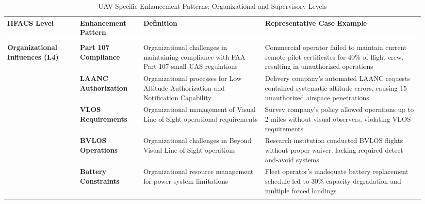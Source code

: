 \begin{table*}[!htbp]
\centering
\caption{UAV-Specific Enhancement Patterns: Organizational and Supervisory Levels}
\label{tab:uav_enhancement_patterns_part1}
\begin{adjustbox}{width=\textwidth,center}
\begin{threeparttable}
\footnotesize
\begin{tabular}{@{}p{2.0cm}p{3.5cm}p{5.0cm}p{4.5cm}@{}}
\toprule
\textbf{HFACS Level} & \textbf{Enhancement Pattern} & \textbf{Definition} & \textbf{Representative Case Example} \\
\midrule

\rowcolor{blue!10}
\multicolumn{4}{c}{\textbf{Level 4: Organizational Influences (6 patterns)}} \\
\midrule

\textbf{Organizational Influences (L4)}
& \textbf{Part 107 Compliance}
& Organizational challenges in maintaining compliance with FAA Part 107 small UAS regulations
& Commercial operator failed to maintain current remote pilot certificates for 40\% of flight crew, resulting in unauthorized operations \\
\addlinespace[0.2ex]

& \textbf{LAANC Authorization}
& Organizational processes for Low Altitude Authorization and Notification Capability
& Delivery company's automated LAANC requests contained systematic altitude errors, causing 15 unauthorized airspace penetrations \\
\addlinespace[0.2ex]

& \textbf{VLOS Requirements}
& Organizational management of Visual Line of Sight operational requirements
& Survey company's policy allowed operations up to 2 miles without visual observers, violating VLOS requirements \\
\addlinespace[0.2ex]

& \textbf{BVLOS Operations}
& Organizational challenges in Beyond Visual Line of Sight operations
& Research institution conducted BVLOS flights without proper waiver, lacking required detect-and-avoid systems \\
\addlinespace[0.2ex]

& \textbf{Battery Constraints}
& Organizational resource management for power system limitations
& Fleet operator's inadequate battery replacement schedule led to 30\% capacity degradation and multiple forced landings \\
\addlinespace[0.2ex]


\end{tabular}
\end{threeparttable}
\end{adjustbox}
\end{table*}
